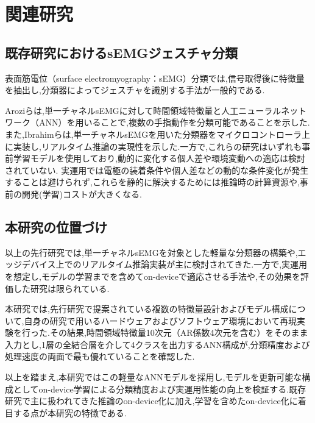\chapter{関連研究}

\section{既存研究におけるsEMGジェスチャ分類}
表面筋電位（surface electromyography：sEMG）分類では,信号取得後に特徴量を抽出し,分類器によってジェスチャを識別する手法が一般的である.

Aroziら\cite{arozi2020}は,単一チャネルsEMGに対して時間領域特徴量と人工ニューラルネットワーク（ANN）を用いることで,複数の手指動作を分類可能であることを示した.また,Ibrahimら\cite{ibrahim}は,単一チャネルsEMGを用いた分類器をマイクロコントローラ上に実装し,リアルタイム推論の実現性を示した.一方で,これらの研究はいずれも事前学習モデルを使用しており,動的に変化する個人差や環境変動への適応は検討されていない.
実運用では電極の装着条件や個人差などの動的な条件変化が発生することは避けられず,これらを静的に解決するためには推論時の計算資源や,事前の開発(学習)コストが大きくなる.
\section{本研究の位置づけ}
以上の先行研究では,単一チャネルsEMGを対象とした軽量な分類器の構築や,エッジデバイス上でのリアルタイム推論実装が主に検討されてきた.一方で,実運用を想定し,モデルの学習までを含めてon-deviceで適応させる手法や,その効果を評価した研究は限られている.

本研究では,先行研究で提案されている複数の特徴量設計およびモデル構成について,自身の研究で用いるハードウェアおよびソフトウェア環境において再現実験を行った.その結果,時間領域特徴量10次元（AR係数4次元を含む）をそのまま入力とし,1層の全結合層を介して4クラスを出力するANN構成が,分類精度および処理速度の両面で最も優れていることを確認した.

以上を踏まえ,本研究ではこの軽量なANNモデルを採用し,モデルを更新可能な構成としてon-device学習による分類精度および実運用性能の向上を検証する.既存研究で主に扱われてきた推論のon-device化に加え,学習を含めたon-device化に着目する点が本研究の特徴である.
